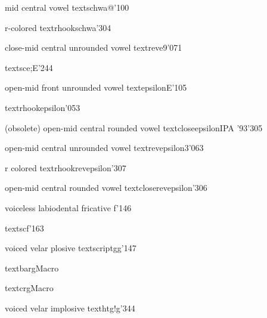 %
  {mid central vowel}%
  {\tbs textschwa}{@}{\ipaall}{'100}

%
  {r-colored \textschwa}%
  {\tbs textrhookschwa}{}{\ipaold}{'304}

%
  {close-mid central unrounded vowel}%
  {\tbs textreve}{9}{\ipaall}{'071}

%
  {}%
  {\tbs textsce}{\tbs;E}{\PSG}{'244}

%
  {open-mid front unrounded vowel}%
  {\tbs textepsilon}{E}{\ipaall}{'105}

%
  {}%
  {\tbs textrhookepsilon}{}{\PSG}{'053}

%
  {(obsolete) open-mid central rounded vowel}%
  {\tbs textcloseepsilon}{}{IPA '93}{'305}%

%
  {open-mid central unrounded vowel}%
  {\tbs textrevepsilon}{3}{\ipaall}{'063}

%
  {r colored \textrevepsilon}%
  {\tbs textrhookrevepsilon}{}{\PSG}{'307}

%
  {open-mid central rounded vowel}%
  {\tbs textcloserevepsilon}{}{\Handbook}{'306}%

%
  {voiceless labiodental fricative}%
  {f}{}{\ipaall}{'146}

%
  {}%
  {\tbs textscf}{}{\PSG}{'163}

%
  {voiced velar plosive}%
  {\tbs textscriptg}{g}{\ipaall}{'147}

%
  {}%
  {\tbs textbarg}{}{\PSG}{Macro}

%
  {}%
  {\tbs textcrg}{}{\PSG}{Macro}

%
  {voiced velar implosive}%
  {\tbs texthtg}{\tbs!g}{\ipaall}{'344}

